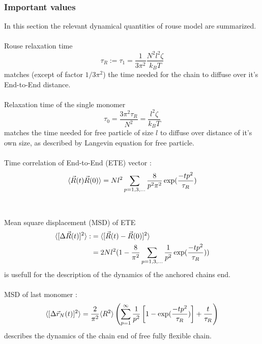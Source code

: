 \documentclass[
    paper=A4,pagesize=automedia,fontsize=12pt,
    BCOR=15mm,DIV=22,
    twoside,headinclude,footinclude=false,
    ngerman,fleqn,             %
    bibliography=totocnumbered,          %
    listof=totoc,                %
    listof=flat,                 %
    cleardoublepage=empty      %
    numbers=endperiod
]{scrartcl}
\begin{document}
\subsubsection{Important values}
In this section the relevant dynamical quantities of rouse model are summarized.
\\
\\
Rouse relaxation time
\begin{equation}
    \tau_R := \tau_1 = \frac{1}{3 \pi^2} \frac{N^2 l^2 \zeta}{k_B T} 
\end{equation}
matches (except of factor $1/3\pi^2$) the time needed for the chain to diffuse over it's End-to-End distance.
\\
\\
Relaxation time of the single monomer
\begin{equation}
    \tau_0 = \frac{3 \pi^2 \tau_R}{N^2} = \frac{l^2 \zeta}{k_B T}
\end{equation}
matches the time needed for free particle of size $l$ to diffuse over distance
of it's own size, as described by Langevin equation for free particle.
\\
\\
Time correlation of End-to-End (ETE) vector \cite{Doi_Edwards_PD:1994}:
\begin{equation}
    \langle\vec{R}(t)\vec{R}(0)\rangle = Nl^2 \sum_{p=1,3,\ldots} \frac{8}{p^2\pi^2}\exp(\frac{-t p^2}{\tau_R})
\end{equation}
\\
\\
Mean square displacement (MSD) of ETE
\begin{equation}
    \begin{aligned}
        \langle[\Delta \vec{R}(t)]^2\rangle :&= \langle[\vec{R}(t)-\vec{R}(0)]^2\rangle \\
        & = 2 N l^2 (1 - \frac{8}{\pi^2}\sum_{p=1,3,\ldots}\frac{1}{p^2} \exp(\frac{-tp^2}{\tau_R}))
    \end{aligned}
\end{equation}
is usefull for the description of the dynamics of the anchored chains end.
\\
\\
MSD of last monomer \cite{svaneborg_2020}:
\begin{equation}
    \langle[\Delta \vec{r}_N(t)]^2\rangle = \frac{2}{\pi^2} \langle R^2\rangle \left( \sum_{p=1}^{\infty} \frac{1}{p^2} \left[ 1-\exp(\frac{-t p^2}{\tau_R}) \right] + \frac{t}{\tau_R} \right)
\end{equation}
describes the dynamics of the chain end of free fully flexible chain.
\end{document}
